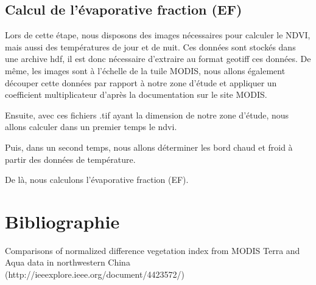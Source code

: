 \documentclass[10pt,a4paper]{article}
\begin{document}
\subsection{Calcul de l'évaporative fraction (EF)}

Lors de cette étape, nous disposons des images nécessaires pour calculer le NDVI, mais aussi des températures de jour et de nuit. Ces données sont stockés dans une archive hdf, il est donc nécessaire d'extraire au format geotiff ces données. De même, les images sont à l'échelle de la tuile MODIS, nous allons également découper cette données par rapport à notre zone d'étude et appliquer un coefficient multiplicateur d'après la documentation sur le site MODIS.

Ensuite, avec ces fichiers .tif ayant la dimension de notre zone d'étude, nous allons calculer dans un premier temps le ndvi.

Puis, dans un second temps, nous allons déterminer les bord chaud et froid à partir des données de température.

De là, nous calculons l'évaporative fraction (EF).

\section{Bibliographie}

Comparisons of normalized difference vegetation index from MODIS Terra and Aqua data in northwestern China (http://ieeexplore.ieee.org/document/4423572/)
\end{document}

